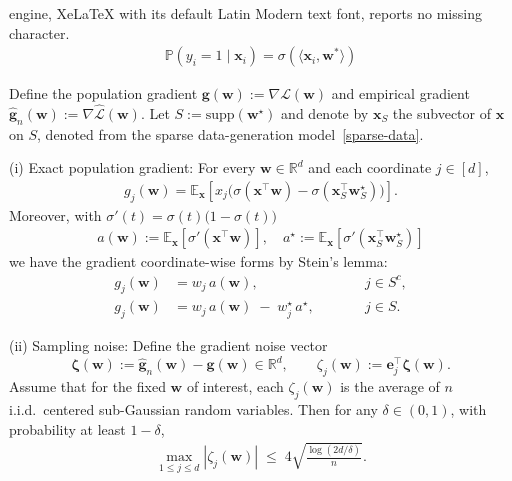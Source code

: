 \documentclass[10pt,a4paper]{amsart}
\begin{document}
engine, XeLaTeX with its default Latin Modern text font, reports no missing character.
\begin{align}
\label{sparse-data}
    \mathbb{P}(y_i = 1 \mid \mathbf{x}_i) = \sigma(\langle \mathbf{x}_i, \mathbf{w}^* \rangle)
\end{align}

\begin{theorem}
\label{pop-grad-restate}
Define the population gradient $\mathbf g(\mathbf w):=\nabla \mathcal L(\mathbf w)$ and empirical gradient
$\widehat{\mathbf g}_n(\mathbf w):=\nabla \widehat{\mathcal L}(\mathbf w)$.
Let $S:=\mathrm{supp}(\mathbf w^\star)$ and denote by $\mathbf x_S$ the subvector of $\mathbf x$ on $S$, denoted from the sparse data-generation model~\eqref{sparse-data}. 

(i) Exact population gradient:
For every $\mathbf w\in\mathbb R^d$ and each coordinate $j\in[d]$,
\begin{align}
g_j(\mathbf w)
=
\mathbb E_{\mathbf x}\!\left[
x_j\Big(\sigma(\mathbf x^\top \mathbf w)-\sigma(\mathbf x_S^\top \mathbf w_S^\star)\Big)
\right].
\label{eq:pop_grad_exact-restate}
\end{align}
Moreover, with $\sigma'(t)=\sigma(t)\bigl(1-\sigma(t)\bigr)$ 
\begin{align}
    a(\mathbf w):=\mathbb E_{\mathbf x}\!\left[\sigma'(\mathbf x^\top \mathbf w)\right],
\quad
a^\star:=\mathbb E_{\mathbf x}\!\left[\sigma'(\mathbf x_S^\top \mathbf w_S^\star)\right]
\end{align}
 we have the gradient coordinate-wise forms by Stein's lemma:
\begin{align}
g_j(\mathbf w) &= w_j\, a(\mathbf w), \qquad && j\in S^c,
\label{eq:pop_grad_inactive-restate}
\\
g_j(\mathbf w) &= w_j\, a(\mathbf w) \;-\; w_j^\star\, a^\star, \qquad && j\in S.
\label{eq:pop_grad_active-restate}
\end{align}

\medskip
(ii) Sampling noise:
Define the gradient noise vector
\[
\boldsymbol\zeta(\mathbf w):=\widehat{\mathbf g}_n(\mathbf w)-\mathbf g(\mathbf w)\in\mathbb R^d,
\qquad
\zeta_j(\mathbf w):=\mathbf e_j^\top \boldsymbol\zeta(\mathbf w).
\]
Assume that for the fixed $\mathbf w$ of interest, each $\zeta_j(\mathbf w)$ is the average of $n$ i.i.d.\ centered sub-Gaussian random variables. Then for any $\delta\in(0,1)$, with probability at least $1-\delta$,
\begin{align}
\max_{1\le j\le d} |\zeta_j(\mathbf w)|
\;\le\;
4\sqrt{\frac{\log(2d/\delta)}{n}}.
\label{eq:uniform_coord_noise}
\end{align}
\end{theorem}
\end{document}
